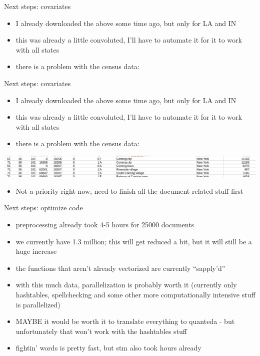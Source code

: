 \documentclass[12pt]{beamer}
\begin{document}
\begin{frame}{Next steps: covariates}
\begin{itemize}
	\item I already downloaded the above some time ago, but only for LA and IN
	\item this was already a little convoluted, I'll have to automate it for it to work with all states
	\item there is a problem with the census data:
\end{itemize}
\end{frame}

\begin{frame}{Next steps: covariates}
\begin{itemize}
	\item I already downloaded the above some time ago, but only for LA and IN
	\item this was already a little convoluted, I'll have to automate it for it to work with all states
	\item there is a problem with the census data:
\end{itemize}
\includegraphics[width=\linewidth]{census_problem.png}
\begin{itemize}
	\item Not a priority right now, need to finish all the document-related stuff first
\end{itemize}
\end{frame}

\begin{frame}{Next steps: optimize code}
\begin{itemize}
	\item preprocessing already took 4-5 hours for 25000 documents
	\item we currently have 1.3 million; this will get reduced a bit, but it will still be a huge increase
	\item the functions that aren't already vectorized are currently ``sapply'd''
	\item with this much data, parallelization is probably worth it (currently only hashtables, spellchecking and some other more computationally intensive stuff is parallelized)
	\item MAYBE it would be worth it to translate everything to quanteda - but unfortunately that won't work with the hashtables stuff
	\item fightin' words is pretty fast, but stm also took hours already
\end{itemize}
\end{frame}
\end{document}
